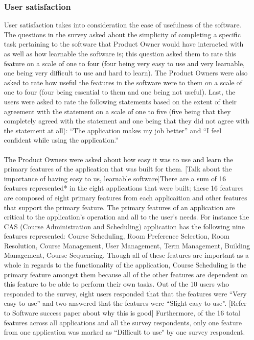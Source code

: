 \subsubsection{User satisfaction}
User satisfaction takes into consideration the ease of usefulness of the software. The questions in the survey asked about the simplicity of completing a specific task pertaining to the  software that Product Owner would have interacted with as well as how learnable the software is; this question asked them to rate this feature on a scale of one to four (four being very easy to use and very learnable, one being very difficult to use and hard to learn). The Product Owners were also asked to rate how useful the features in the software were to them on a scale of one to four (four being essential to them and one being not useful). Last, the users were asked to rate the following statements based on the extent of their agreement with the statement on a scale of one to five (five being that they completely agreed with the statement and one being that they did not agree with the statement at all): ``The application makes my job better'' and ``I feel confident while using the application.''

\paragraph{} The Product Owners were asked about how easy it was to use and learn the primary features of the application that was built for them. [Talk about the importance of having easy to us, learnable software]There are a sum of 16 features represented* in the eight applications that were built; these 16 features are composed of eight primary features from each applicaition and other features that support the primary feature. The primary features of an application are critical to the application's operation and all to the user's needs. For instance the CAS (Course Administration and Scheduling) application has the following nine features represented: Course Scheduling, Room Preference Selection, Room Resolution, Course Management, User Management, Term Management, Building Management, Course Sequencing. Though all of these features are important as a whole in regards to the functionality of the application, Course Scheduling is the primary feature amongst them because all of the other features are dependent on this feature to be able to  perform their own tasks. Out of the 10 users who responded to the survey, eight users responded that that the features were ``Very easy to use'' and two answered that the features were ``Slight easy to use''. [Refer to Software success paper about why this is good] Furthermore, of the 16 total features across all applications and all the survey respondents, only one feature from one application was marked as ``Difficult to use" by one survey respondent.

